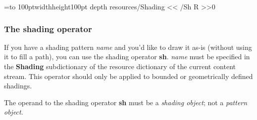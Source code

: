 \immediate{}

\immediate{}

\bgroup
{}=\hbox to 100pt{\vrule width\z@ height100pt depth\z@%
}
\pdfxform resources{/Shading << /Sh \the\pdflastobj{} R >>}0

\centerline{\pdfrefxform\pdflastxform}
\egroup

\subsubsection{The shading operator}

If you have a shading pattern {\it name} and you'd like to draw it as-is (without using it to fill a path),
you can use the shading operator {\bf sh}.
{\it name} must be specified in the {\bf Shading} subdictionary of the resource dictionary of the current
content stream.
This operator should only be applied to bounded or geometrically defined shadings.

\bnote
    The operand to the shading operator {\bf sh} must be a {\it shading object}; not a {\it pattern object}.
\eppbox


